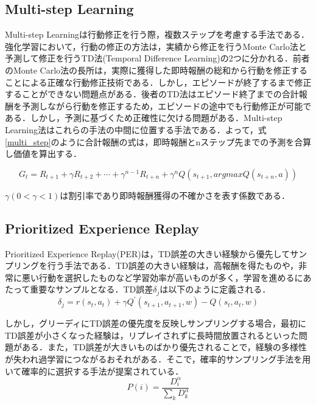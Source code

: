 \documentclass[12pt]{sonota/aislab}
\begin{document}
\subsection{Multi-step Learning}
Multi-step Learningは行動修正を行う際，複数ステップを考慮する手法である\cite{rl_book}．強化学習において，行動の修正の方法は，実績から修正を行うMonte Carlo法と予測して修正を行うTD法(Temporal Difference Learning)の2つに分かれる．前者のMonte Carlo法の長所は，実際に獲得した即時報酬の総和から行動を修正することによる正確な行動修正技術である．しかし，エピソードが終了するまで修正することができない問題点がある．後者のTD法はエピソード終了までの合計報酬を予測しながら行動を修正するため，エピソードの途中でも行動修正が可能である．しかし，予測に基づくため正確性に欠ける問題がある．Multi-step Learning法はこれらの手法の中間に位置する手法である．よって，式\ref{multi_step}のように合計報酬の式は，即時報酬とnステップ先までの予測を合算し価値を算出する．

\begin{equation}
\label{multi-step}
G_{t}=R_{t+1}+\gamma R_{t+2}+\cdots+\gamma^{n-1}R_{t+n}+\gamma^n Q(s_{t+1},argmaxQ(s_{t+n},a)) \label{multi_step}
\end{equation}

$\gamma(0<\gamma<1)$は割引率であり即時報酬獲得の不確かさを表す係数である．

\subsection{Prioritized Experience Replay}
Prioritized Experience Replay(PER)は，TD誤差の大きい経験から優先してサンプリングを行う手法である\cite{prioritized}．TD誤差の大きい経験は，高報酬を得たものや，非常に悪い行動を選択したものなど学習効率が高いものが多く，学習を進めるにあたって重要なサンプルとなる．TD誤差$\delta_{j}$は以下のように定義される．
\begin{equation}
\label{TD_error}
  \delta_{j}=r(s_{t},a_{t})+\gamma Q^{\prime}(s_{t+1},a_{t+1},w)-Q(s_{t},a_{t},w)
\end{equation}

しかし，グリーディにTD誤差の優先度を反映しサンプリングする場合，最初にTD誤差が小さくなった経験は，リプレイされずに長時間放置されるといった問題がある．また，TD誤差が大きいものばかり優先されることで，経験の多様性が失われ過学習につながるおそれがある．そこで，確率的サンプリング手法を用いて確率的に選択する手法が提案されている．
\begin{equation}
\label{sum_P_i}
  P(i)=\frac{D_{i}^{\alpha}}{\sum_{k}D_{k}^{\alpha}} \label{P_i}
\end{equation}
\end{document}

